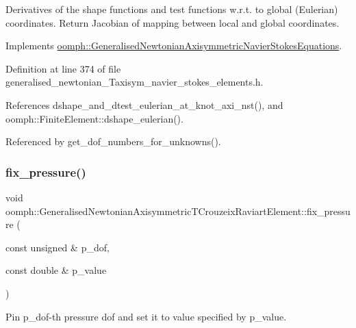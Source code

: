 Derivatives of the shape functions and test functions w.\+r.\+t. to global (Eulerian) coordinates. Return Jacobian of mapping between local and global coordinates. 

Implements \hyperlink{classoomph_1_1GeneralisedNewtonianAxisymmetricNavierStokesEquations_a9321e8563cb2dfec9824024008a6914e}{oomph\+::\+Generalised\+Newtonian\+Axisymmetric\+Navier\+Stokes\+Equations}.



Definition at line 374 of file generalised\+\_\+newtonian\+\_\+\+Taxisym\+\_\+navier\+\_\+stokes\+\_\+elements.\+h.



References dshape\+\_\+and\+\_\+dtest\+\_\+eulerian\+\_\+at\+\_\+knot\+\_\+axi\+\_\+nst(), and oomph\+::\+Finite\+Element\+::dshape\+\_\+eulerian().



Referenced by get\+\_\+dof\+\_\+numbers\+\_\+for\+\_\+unknowns().

\mbox{\label{classoomph_1_1GeneralisedNewtonianAxisymmetricTCrouzeixRaviartElement_ae423d454bc4443e5b48573c8e7bc7671}} 
\subsubsection{\texorpdfstring{fix\+\_\+pressure()}{fix\_pressure()}}
{\footnotesize\ttfamily void oomph\+::\+Generalised\+Newtonian\+Axisymmetric\+T\+Crouzeix\+Raviart\+Element\+::fix\+\_\+pressure (\begin{DoxyParamCaption}\item[{const unsigned \&}]{p\+\_\+dof,  }\item[{const double \&}]{p\+\_\+value }\end{DoxyParamCaption})\hspace{0.3cm}{\ttfamily [inline]}}



Pin p\+\_\+dof-\/th pressure dof and set it to value specified by p\+\_\+value. 



